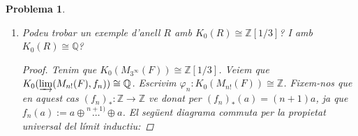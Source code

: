 \documentclass[compress]{article}
\newtheorem{problema}{Problema}
\theoremstyle{definition}
\begin{document}
\begin{problema}
\begin{enumerate}
\begin{proof}
            Escrivim $\varphi_{n}:K_{0}(M_{2^{n}}(F))\cong\mathbb{Z}$. Donats $\phi_{n}:K_{0}(M_{p^{n}}(F))\rightarrow S$ morfisme de grups, $S$ grup abelià, el següent diagrama commuta:
            \begin{center}
            \end{center}
            on $\Phi:\mathbb{Z}[1/p]\rightarrow S$ és l'únic morfisme de grups (ben) definit via $\Phi(\sum_{i=0}^{n}\frac{a_{i}}{p^{i}}):=\sum_{i=0}^{n}\phi_{i}(\frac{a_{i}}{p^{i}})$. Per tant,
            \begin{align*}
                \mathbb{Z}[1/p]
                &\cong\varinjlim(K_{0}(M_{p^{n}}(F)),K_{0}(f_{n}))
                &\quad&\textrm{(Propietat universal del sistema inductiu $(K_{0}(M_{p^{n}}(F)),K_{0}(f_{n}))$)}\\
                &\cong K_{0}(\varinjlim(M_{p^{n}}(F),f_{n}))
                &\quad&\textrm{($K_{0}$ preserva els límits inductius)}\\
                &=K_{0}(M_{p^{\infty}}(F))
                &\quad&\textrm{(Per definició de $M_{p^{\infty}}(F)$)}
            \end{align*}
            com volíem.
        \end{proof}
        \item Podeu trobar un exemple d'anell $R$ amb $K_{0}(R)\cong\mathbb{Z}[1/3]$? I amb $K_{0}(R)\cong\mathbb{Q}$?
        \begin{proof}
            Tenim que $K_{0}(M_{3^{\infty}}(F))\cong\mathbb{Z}[1/3]$.\newline
            Veiem que $K_{0}(\varinjlim(M_{n!}(F),f_{n}))\cong\mathbb{Q}$. Escrivim $\varphi_{n}:K_{0}(M_{n!}(F))\cong\mathbb{Z}$. Fixem-nos que en aquest cas $(f_{n})_{*}:\mathbb{Z}\rightarrow\mathbb{Z}$ ve donat per $(f_{n})_{*}(a)=(n+1)a$, ja que $f_{n}(a):=a\oplus\overset{n+1)}{\ldots}\oplus a$. El següent diagrama commuta per la propietat universal del límit inductiu:

\end{proof}
\end{enumerate}
\end{problema}
\end{document}
